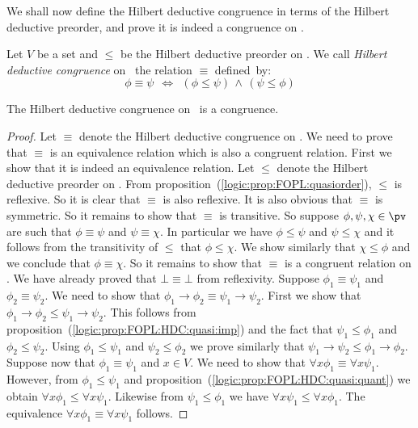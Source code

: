 We shall now define the Hilbert deductive congruence in terms of the
Hilbert deductive preorder, and prove it is indeed a congruence on
\pv. 
\begin{defin}\label{logic:def:FOPL:HDC:HDC}
Let $V$ be a set and $\leq$ be the Hilbert deductive preorder on
\pv. We call {\em Hilbert deductive congruence} on \pv\ the relation
$\equiv$ defined~by:
    \[
    \phi\equiv\psi\ \ \Leftrightarrow\ \
    (\phi\leq\psi)\,\land\,(\psi\leq\phi)
    \]
\end{defin}
\begin{prop}\label{logic:prop:FOPL:HDC:congruence}
The Hilbert deductive congruence on \pv\ is a congruence.
\end{prop}
\begin{proof}
Let $\equiv$ denote the Hilbert deductive congruence on \pv. We need
to prove that $\equiv$ is an equivalence relation which is also a
congruent relation. First we show that it is indeed an equivalence
relation. Let $\leq$ denote the Hilbert deductive preorder on \pv.
From proposition~(\ref{logic:prop:FOPL:quasiorder}), $\leq$ is
reflexive. So it is clear that $\equiv$ is also reflexive. It is
also obvious that $\equiv$ is symmetric. So it remains to show that
$\equiv$ is transitive. So suppose $\phi,\psi,\chi\in\pv$ are such
that $\phi\equiv\psi$ and $\psi\equiv\chi$. In particular we have
$\phi\leq\psi$ and $\psi\leq\chi$ and it follows from the
transitivity of $\leq$ that $\phi\leq\chi$. We show similarly that
$\chi\leq\phi$ and we conclude that $\phi\equiv\chi$. So it remains
to show that $\equiv$ is a congruent relation on \pv. We have
already proved that $\bot\equiv\bot$ from reflexivity. Suppose
$\phi_{1}\equiv\psi_{1}$ and $\phi_{2}\equiv\psi_{2}$. We need to
show that $\phi_{1}\to\phi_{2}\equiv\psi_{1}\to\psi_{2}$. First we
show that $\phi_{1}\to\phi_{2}\leq\psi_{1}\to\psi_{2}$. This follows
from proposition~(\ref{logic:prop:FOPL:HDC:quasi:imp}) and the fact
that $\psi_{1}\leq\phi_{1}$ and $\phi_{2}\leq\psi_{2}$. Using
$\phi_{1}\leq\psi_{1}$ and $\psi_{2}\leq\phi_{2}$ we prove similarly
that $\psi_{1}\to\psi_{2}\leq\phi_{1}\to\phi_{2}$. Suppose now that
$\phi_{1}\equiv\psi_{1}$ and $x\in V$. We need to show that $\forall
x\phi_{1}\equiv\forall x\psi_{1}$. However, from
$\phi_{1}\leq\psi_{1}$ and
proposition~(\ref{logic:prop:FOPL:HDC:quasi:quant}) we obtain
$\forall x\phi_{1}\leq\forall x\psi_{1}$. Likewise from
$\psi_{1}\leq\phi_{1}$ we have $\forall x\psi_{1}\leq\forall
x\phi_{1}$. The equivalence $\forall x\phi_{1}\equiv\forall
x\psi_{1}$ follows.
\end{proof}

